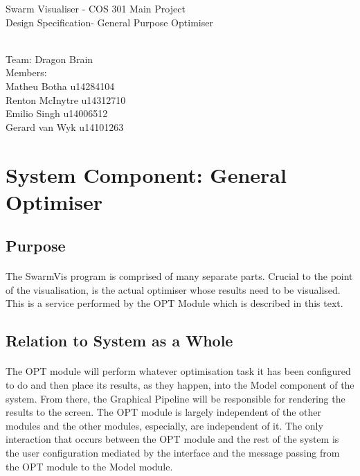 \documentclass[11pt]{article}
\begin{document}
\begin{titlepage}

\begin{center}
\begin{huge}
Swarm Visualiser - COS 301 Main Project
\\
Design Specification- General Purpose Optimiser
\begin{small}
\\
Team: Dragon Brain
\\
Members:
\\
Matheu Botha u14284104
\\
Renton McInytre u14312710
\\
Emilio Singh u14006512
\\
Gerard van Wyk u14101263

\end{small}

\end{huge}
\end{center}
\end{titlepage}

\pagebreak

\tableofcontents
\pagebreak
\section{System Component: General Optimiser}
\subsection{Purpose}
\paragraph{}
The SwarmVis program is comprised of many separate parts. Crucial to the point of the visualisation, is the actual optimiser whose results need to be visualised. This is a service performed by the OPT Module which is described in this text.
\subsection{Relation to System as a Whole}
\paragraph{}
The OPT module will perform whatever optimisation task it has been configured to do and then place its results, as they happen, into the Model component of the system. From there, the Graphical Pipeline will be responsible for rendering the results to the screen. The OPT module is largely independent of the other modules and the other modules, especially, are independent of it. The only interaction that occurs between the OPT module and the rest of the system is the user configuration mediated by the interface and the message passing from the OPT module to the Model module.
\end{document}
